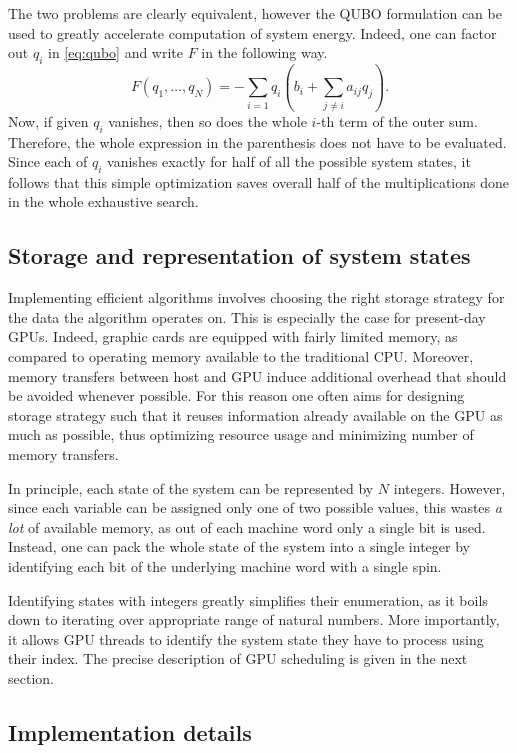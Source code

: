 The two problems are clearly equivalent, however the QUBO formulation can be used to greatly accelerate computation of system energy. Indeed, one can factor out $q_i$ in \eqref{eq:qubo} and write $F$ in the following way.
\begin{equation}
    F(q_1, \ldots, q_N) = -\sum_{i=1}q_i \left(b_i + \sum_{j\ne i} a_{ij} q_j \right).
\end{equation}
Now, if given $q_i$ vanishes, then so does the whole $i$-th term of the outer sum. Therefore, the whole expression in the parenthesis does not have to be evaluated. Since each of $q_i$ vanishes exactly for half of all the possible system states, it follows that this simple optimization saves overall half of the multiplications done in the whole exhaustive search.

\subsection{Storage and representation of system states}
Implementing efficient algorithms involves choosing the right storage strategy for the data the algorithm operates on. This is especially the case for present-day GPUs. Indeed, graphic cards are equipped with fairly limited memory, as compared to operating memory available to the traditional CPU. Moreover, memory transfers between host and GPU induce additional overhead that should be avoided whenever possible. For this reason one often aims for designing storage strategy such that it reuses information already available on the GPU as much as possible, thus optimizing resource usage and minimizing number of memory transfers.

In principle, each state of the system can be represented by $N$ integers. However, since each variable can be assigned only one of two possible values, this wastes \emph{a lot} of available memory, as out of each machine word only a single bit is used. Instead, one can pack the whole state of the system into a single integer by identifying each bit of the underlying machine word with a single spin. 

Identifying states with integers greatly simplifies their enumeration, as it boils down to iterating over appropriate range of natural numbers. More importantly, it allows GPU threads to identify the system state they have to process using their index. The precise description of GPU scheduling is given in the next section.

\subsection{Implementation details}
